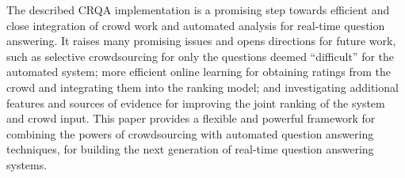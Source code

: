 \documentclass[letterpaper]{article}
\begin{document}
The described CRQA implementation is a promising step towards efficient and close integration of crowd work and automated analysis for real-time question answering.
It raises many promising issues and opens directions for future work, such as selective crowdsourcing for only the questions deemed ``difficult'' for the automated system; more efficient online learning for obtaining ratings from the crowd and integrating them into the ranking model; and investigating additional features and sources of evidence for improving the joint ranking of the system and crowd input.
This paper provides a flexible and powerful framework for combining the powers of crowdsourcing with automated question answering techniques, for building the next generation of real-time question answering systems.



\bigskip
\bigskip



\end{document}
